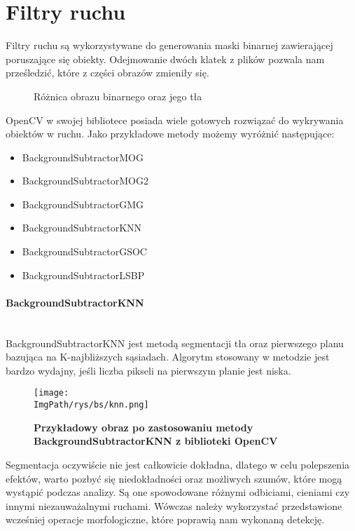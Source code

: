 \documentclass[a4paper,12pt,twoside,openany]{report}
\newcommand{\ImgPath}{.}
\begin{document}
\section{Filtry ruchu}
Filtry ruchu są wykorzystywane do generowania maski binarnej zawierającej poruszające się obiekty. Odejmowanie dwóch klatek z plików pozwala nam prześledzić, które z części obrazów zmieniły się. 

\begin{figure}[H]
	\centering
	\caption{Różnica obrazu binarnego oraz jego tła}
\end{figure}

OpenCV w swojej bibliotece posiada wiele gotowych rozwiązać do wykrywania obiektów w ruchu\cite{opencvs2}. Jako przykładowe metody możemy wyróżnić następujące:
\begin{itemize} 
	\item BackgroundSubtractorMOG
	\item BackgroundSubtractorMOG2
	\item BackgroundSubtractorGMG
	\item BackgroundSubtractorKNN
	\item BackgroundSubtractorGSOC
	\item BackgroundSubtractorLSBP
\end{itemize} 
	
\paragraph{BackgroundSubtractorKNN} \mbox{} \\
 \indent
 BackgroundSubtractorKNN jest metodą segmentacji tła oraz pierwszego planu bazująca na K-najbliższych sąsiadach. Algorytm stosowany w metodzie jest bardzo wydajny, jeśli liczba pikseli na pierwszym planie jest niska\cite{KNN}. 

\begin{figure}[H]	
	\centering
	\texttt{[image: \\ImgPath/rys/bs/knn.png]}
	
	\caption{  \textbf{Przykładowy obraz po zastosowaniu metody BackgroundSubtractorKNN z biblioteki OpenCV}}
\end{figure}
 
 Segmentacja oczywiście nie jest całkowicie dokładna, dlatego w celu polepszenia efektów, warto pozbyć się niedokładności oraz możliwych szumów,  które mogą wystąpić podczas analizy. Są one spowodowane różnymi odbiciami, cieniami czy innymi niezauważalnymi ruchami. Wówczas należy wykorzystać przedstawione wcześniej operacje morfologiczne, które poprawią nam wykonaną detekcję.
\end{document}
